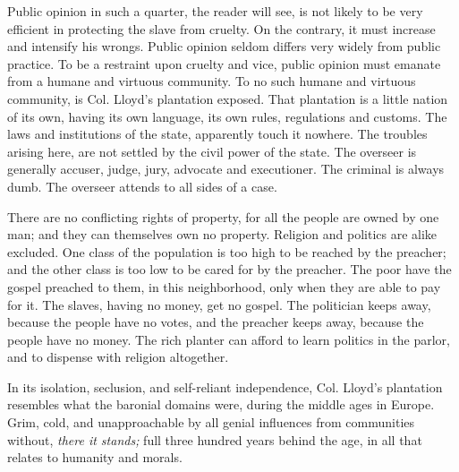 Public opinion in such a quarter, the reader will see, is not likely to
be very efficient in protecting the slave from cruelty. On the contrary,
it must increase and intensify his wrongs. Public opinion seldom differs
very widely from public practice. To be a restraint upon cruelty and
vice, public opinion must emanate from a humane and virtuous community.
To no such {\protect\hypertarget{64}{}{}}humane and virtuous community,
is Col. Lloyd's plantation exposed. That plantation is a little nation
of its own, having its own language, its own rules, regulations and
customs. The laws and institutions of the state, apparently touch it
nowhere. The troubles arising here, are not settled by the civil power
of the state. The overseer is generally accuser, judge, jury, advocate
and executioner. The criminal is always dumb. The overseer attends to
all sides of a case.

There are no conflicting rights of property, for all the people are
owned by one man; and they can themselves own no property. Religion and
politics are alike excluded. One class of the population is too high to
be reached by the preacher; and the other class is too low to be cared
for by the preacher. The poor have the gospel preached to them, in this
neighborhood, only when they are able to pay for it. The slaves, having
no money, get no gospel. The politician keeps away, because the people
have no votes, and the preacher keeps away, because the people have no
money. The rich planter can afford to learn politics in the parlor, and
to dispense with religion altogether.

In its isolation, seclusion, and self-reliant independence, Col. Lloyd's
plantation resembles what the baronial domains were, during the middle
ages in Europe. Grim, cold, and unapproachable by all genial influences
from communities without, \emph{there it stands;} full three hundred
years behind the age, in all that relates to humanity and morals.

